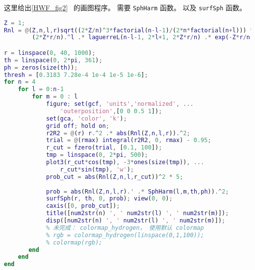 
\begin{issues}
\issueDraft
\end{issues}


这里给出\autoref{HWF_fig2}~ 的画图程序。 需要 \verb|SphHarm| 函数。 以及 \verb|surfSph| 函数。

\begin{lstlisting}[language=matlab, caption=hydrogen\_plot.m]
Z = 1;
Rnl = @(Z,n,l,r)sqrt((2*Z/n)^3*factorial(n-l-1)/(2*n*factorial(n+l))) *...
        (2*Z*r/n).^l .* laguerreL(n-l-1, 2*l+1, 2*Z*r/n) .* exp(-Z*r/n);

r = linspace(0, 40, 1000);
th = linspace(0, 2*pi, 361);
ph = zeros(size(th));
thresh = [0.3183 7.28e-4 1e-4 1e-5 1e-6];
for n = 4
    for l = 0:n-1
        for m = 0 : l
            figure; set(gcf, 'units','normalized', ...
                'outerposition',[0 0 0.5 1]);
            set(gca, 'color', 'k');
            grid off; hold on;
            r2R2 = @(r) r.^2 .* abs(Rnl(Z,n,l,r)).^2;
            trial = @(rmax) integral(r2R2, 0, rmax) - 0.95;
            r_cut = fzero(trial, [0.1, 100]);
            tmp = linspace(0, 2*pi, 500);
            plot3(r_cut*cos(tmp), -3*ones(size(tmp)), ...
                r_cut*sin(tmp), 'w');
            prob_cut = abs(Rnl(Z,n,l,r_cut))^2 * 5;
            
            prob = abs(Rnl(Z,n,l,r).' .* SphHarm(l,m,th,ph)).^2;
            surfSph(r, th, 0, prob); view(0, 0);
            caxis([0, prob_cut]);
            title([num2str(n) ', ' num2str(l) ', ' num2str(m)]);
            disp([num2str(n) ', ' num2str(l) ', ' num2str(m)]);
            % 未完成： colormap_hydrogen， 使用默认 colormap
            % rgb = colormap_hydrogen(linspace(0,1,100));
            % colormap(rgb);
       end
    end
end
\end{lstlisting}
